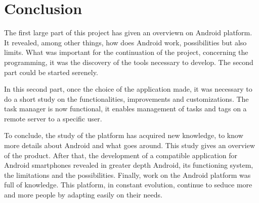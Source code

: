 \chapter{Conclusion}

\vspace{2cm}

\noindent The first large part of this project has given an overviewn on Android platform. It revealed, among other things, how does Android work, possibilities but also limits. What was important for the continuation of the project, concerning the programming, it was the discovery of the tools necessary to develop. The second part could be started serenely.

\noindent In this second part, once the choice of the application made, it was necessary to do a short study on the functionalities, improvements and customizations. The task manager is now functional, it enables management of tasks and tags on a remote server to a specific user.

\noindent To conclude, the study of the platform has acquired new knowledge, to know more details about Android and what goes around. This study gives an overview of the product.
After that, the development of a compatible application for Android smartphones revealed in greater depth Android, its functioning system, the limitations and the possibilities.
Finally, work on the Android platform was full of knowledge. This platform, in constant evolution, continue to seduce more and more people by adapting easily on their needs.


\clearpage
